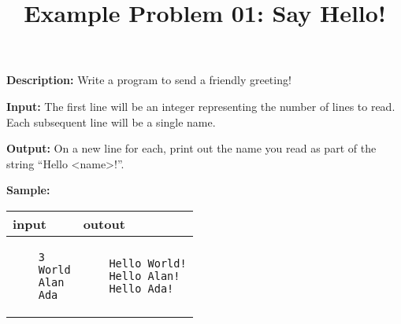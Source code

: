 \documentclass[a4paper]{article}
\title{Example Problem 01: Say Hello!}
\date{} %
\begin{document}
\lstset{
    language=java,
    basicstyle=\ttfamily,
    numbers=left,
    numbersep=8pt,
    showspaces=false,
    showstringspaces=false
}
\maketitle
\textbf{Description:} Write a program to send a friendly greeting! 

\textbf{Input:} The first line will be an integer representing the number of lines to read. Each subsequent line will be a single name.

\textbf{Output:} On a new line for each, print out the name you read as part of the string ``Hello \textless name\textgreater!''.

\textbf{Sample:}

\begin{tabular}{|p{}|p{}|}
    \hline
    \textbf{input} & \textbf{outout} \\
    \hline
    \begin{verbatim}
    3
    World
    Alan
    Ada
    \end{verbatim} &
    \begin{verbatim}
    Hello World!
    Hello Alan!
    Hello Ada!
    \end{verbatim} \\
    \hline
\end{tabular}
\end{document}
